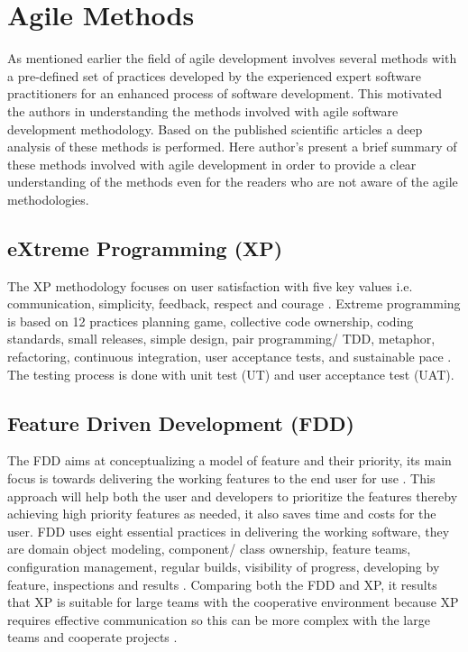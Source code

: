 \documentclass[a4paper,oneside]{bth}
\begin{document}
\section {Agile Methods}
As mentioned earlier the field of agile development involves several methods with a pre-defined set of practices developed by the experienced expert software practitioners for an enhanced process of software development. This motivated the authors in understanding the methods involved with agile software development methodology. Based on the published scientific articles a deep analysis of these methods is performed. Here author’s present a brief summary of these methods involved with agile development in order to provide a clear understanding of the methods even for the readers who are not aware of the agile methodologies. 
\subsection{eXtreme Programming (XP)}
The XP methodology focuses on user satisfaction with five key values i.e. communication, simplicity, feedback, respect and courage \cite{al_tamimi_empirical_2014}. Extreme programming is based on 12 practices planning game, collective code ownership, coding standards, small releases, simple design, pair programming/ TDD, metaphor, refactoring, continuous integration, user acceptance tests, and sustainable pace \cite{al_tamimi_empirical_2014}. The testing process is done with unit test (UT) and user acceptance test (UAT).
\subsection{Feature Driven Development (FDD)}
The FDD aims at conceptualizing a model of feature and their priority, its main focus is towards delivering the working features to the end user for use \cite{al_tamimi_empirical_2014}. This approach will help both the user and developers to prioritize the features thereby achieving high priority features as needed, it also saves time and costs for the user. FDD uses eight essential practices in delivering the working software, they are domain object modeling, component/ class ownership, feature teams, configuration management, regular builds, visibility of progress, developing by feature, inspections and results \cite{al_tamimi_empirical_2014}. Comparing both the FDD and XP, it results that XP is suitable for large teams with the cooperative environment because XP requires effective communication so this can be more complex with the large teams and cooperate projects \cite{al_tamimi_empirical_2014}.
\end{document}
